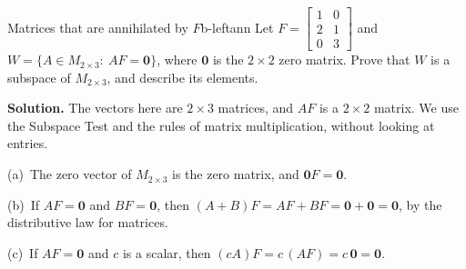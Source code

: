 \documentclass[11pt]{article}
\begin{document}
\begin{exmp}{Matrices that are annihilated by $F$}{b-leftann}
Let $F=\begin{bmatrix}1&0\\2&1\\0&3\end{bmatrix}$ and $W=\{A\in M_{2\times3}:\ AF=\mathbf{0}\}$, where $\mathbf{0}$ is the $2\times2$ zero matrix. Prove that $W$ is a subspace of $M_{2\times3}$, and describe its elements.

\textbf{Solution.} The vectors here are $2\times3$ matrices, and $AF$ is a $2\times2$ matrix. We use the Subspace Test and the rules of matrix multiplication, without looking at entries.

(a)~The zero vector of $M_{2\times3}$ is the zero matrix, and $\mathbf{0}F=\mathbf{0}$.

(b)~If $AF=\mathbf{0}$ and $BF=\mathbf{0}$, then $(A+B)F=AF+BF=\mathbf{0}+\mathbf{0}=\mathbf{0}$, by the distributive law for matrices.

(c)~If $AF=\mathbf{0}$ and $c$ is a scalar, then $(cA)F=c\,(AF)=c\,\mathbf{0}=\mathbf{0}$.


\end{exmp}
\end{document}

